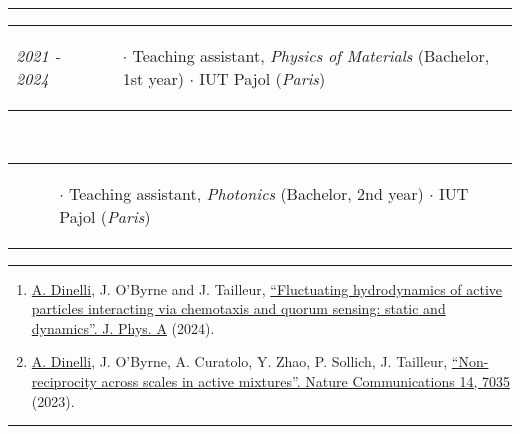 \documentclass{scrartcl}
\newcommand{\NewItemEntry}[2]{
  \noindent
  \begin{tabular}[r]{p{2.5cm} p{14.0cm}}
    \-\hspace{0.5cm} \small \textit{#1}
    &
    \begin{itemize}
      \vspace{-0.65cm}
      \item[$\cdot$] #2
    \end{itemize}
  \end{tabular}
  \vspace{-0.2cm}
}
\begin{document}
\begin{cv}{}
\begin{tabular}{p{4cm}|p{14cm}}
\end{tabular}
\vspace{1em}

\par\noindent\rule{\textwidth}{0.4pt}

\vspace{1.5em}










\noindent{}\vspace{1em}
\def\v{-0.1cm}

\NewItemEntry{2021 - 2024}{Teaching assistant, \textit{Physics of Materials} (Bachelor, 1st year) $\cdotp$ IUT Pajol (\textit{Paris})}\\[\v]
\NewItemEntry{}{Teaching assistant, \textit{Photonics} (Bachelor, 2nd year) $\cdotp$ IUT Pajol (\textit{Paris})}

\vspace{1em}

\par\noindent\rule{\textwidth}{0.4pt}

\vspace{1.5em}


\newpage


\noindent{}\vspace{1em}
\small
\begin{enumerate}
\item \underline{A. Dinelli}, J. O’Byrne and J. Tailleur, \href{https://iopscience.iop.org/article/10.1088/1751-8121/ad72bc}{``Fluctuating hydrodynamics of active particles interacting via chemotaxis and quorum sensing: static and dynamics''. J. Phys. A} (2024).
\item \underline{A. Dinelli}, J. O’Byrne, A. Curatolo, Y. Zhao, P. Sollich, J. Tailleur, \href{https://doi.org/10.1038/s41467-023-42713-5}{``Non-reciprocity across scales in active mixtures''. Nature Communications 14, 7035} (2023). 
\end{enumerate}
  

\par\noindent\rule{\textwidth}{0.4pt}

\vspace{1.5em}







\end{cv}
\end{document}
